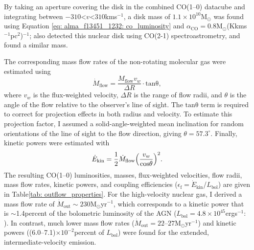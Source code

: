By taking an aperture covering the disk in the combined CO(1--0) datacube and integrating between $-310$\;\textless\;$v$\;\textless\;$310$\;km\;s$^{-1}$, a disk mass of $1.1\times10^{10}$\;M$_\odot$ was found using Equation \ref{eq: alma_f13451_1232: co_luminosity} and $\alpha_\mathrm{CO}=0.8$\;M$_\odot$\;(K\;km\;s$^{-1}$\;pc$^2$)$^{-1}$; \citet{Lamperti2022} also detected this nuclear disk using CO(2-1) spectroastrometry, and found a similar mass.

The corresponding mass flow rates of the non-rotating molecular gas were estimated using
\begin{equation}
    \dot{M}_\mathrm{flow} = \frac{M_\mathrm{flow}v_w}{\Delta R} \cdot \mathrm{tan\theta},
\end{equation}
where $v_w$ is the flux-weighted velocity, $\Delta R$ is the range of flow radii, and $\theta$ is the angle of the flow relative to the observer's line of sight. The $\mathrm{tan\theta}$ term is required to correct for projection effects in both radius and velocity. To estimate this projection factor, I assumed a solid-angle-weighted mean inclination for random orientations of the line of sight to the flow direction, giving $\theta=57.3^\circ$. Finally, kinetic powers were estimated with
\begin{equation}
    \dot{E}_\mathrm{kin}=\frac{1}{2}\dot{M}_\mathrm{flow}\Bigl(\frac{v_w}{\mathrm{cos\theta}}\Bigl)^2.
    \label{eq: alma_f13451_1232: kinetic_power}
\end{equation}
The resulting CO(1--0) luminosities, masses, flux-weighted velocities, flow radii, mass flow rates, kinetic powers, and coupling efficiencies ($\epsilon_\mathrm{f}=\dot{E}_\mathrm{kin}$/$L_\mathrm{bol}$) are given in Table\;\ref{tab: outflow_properties}. For the high-velocity nuclear gas, I derived a mass flow rate of $\dot{M}_\mathrm{out}\sim230$\;M$_\odot$\;yr$^{-1}$, which corresponds to a kinetic power that is $\sim$1.4\;per\;cent of the bolometric luminosity of the AGN ($L_\mathrm{bol}=4.8\times10^{45}$\;erg\;s$^{-1}$: \citealt{Rose2018}). In contrast, much lower mass flow rates ($\dot{M}_\mathrm{out}=22$--$27$\;M$_\odot$\;yr$^{-1}$) and kinetic powers ((6.0--7.1)$\times10^{-2}$\;per\;cent of $L_\mathrm{bol}$) were found for the extended, intermediate-velocity emission.

